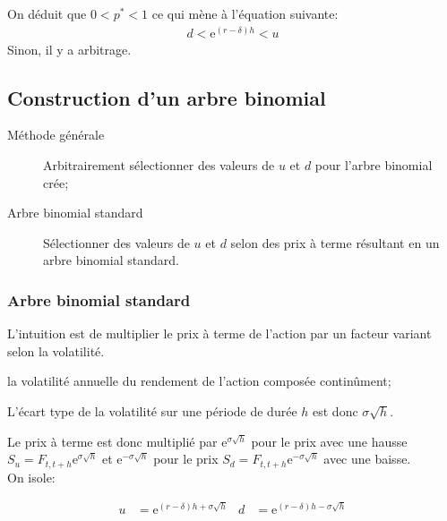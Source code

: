 \documentclass[10pt, french]{article}
\begin{document}
\begin{multicols*}{2}
On déduit que $0 < p^{*} < 1$ ce qui mène à l'équation suivante:
	\begin{align*}
	d < \textrm{e}^{(r - \delta)h} < u
	\end{align*}
Sinon, il y a arbitrage.

\subsection*{Construction d'un arbre binomial}

\begin{description}
	\item[Méthode générale]	Arbitrairement sélectionner des valeurs de $u$ et $d$ pour l'arbre binomial crée;
	\item[Arbre binomial standard]	Sélectionner des valeurs de $u$ et $d$ selon des prix à terme résultant en un arbre binomial standard.
\end{description}

\subsubsection*{Arbre binomial standard}
L'intuition est de multiplier le prix à terme de l'action par un facteur variant selon la volatilité.

\begin{distributions}[Notation]
\begin{description}[leftmargin = *]
	\item[$\sigma$]	la volatilité annuelle du rendement de l'action composée continûment;
	\item[]	L'écart type de la volatilité sur une période de durée $h$ est donc $\sigma \sqrt{h}$.
\end{description}
\end{distributions}

Le prix à terme est donc multiplié par $\textrm{e}^{\sigma \sqrt{h}}$ pour le prix avec une hausse $S_{u} = F_{t, t + h}\textrm{e}^{\sigma \sqrt{h}}$ et $\textrm{e}^{-\sigma \sqrt{h}}$ pour le prix $S_{d} = F_{t, t + h}\textrm{e}^{-\sigma \sqrt{h}}$ avec une baisse.\\

On isole:
\begin{rappel}{}
	\begin{align*}
	u	&=	\textrm{e}^{(r - \delta)h + \sigma \sqrt{h}}	&
	d	&=	\textrm{e}^{(r - \delta)h - \sigma \sqrt{h}}
	\end{align*}
\end{rappel}


\end{multicols*}
\end{document}
